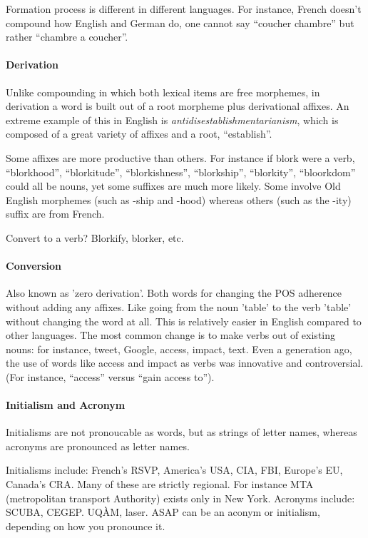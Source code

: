\documentclass{exam}
\begin{document}
Formation process is different in different languages. 
For instance, French doesn't compound how English and German do, one cannot say ``coucher chambre'' but rather ``chambre a coucher''. 

\paragraph{Derivation} Unlike compounding in which both lexical items are free morphemes, in derivation a word is built out of a root morpheme plus derivational affixes. 
An extreme example of this in English is \textit{antidisestablishmentarianism}, which is composed of a great variety of affixes and a root, ``establish''. 

Some affixes are more productive than others. For instance if blork were a verb, ``blorkhood'', ``blorkitude'', ``blorkishness'', ``blorkship'', ``blorkity'', ``bloorkdom'' could all be nouns, yet some suffixes are much more likely.  
Some involve Old English morphemes (such as -ship and -hood) whereas others (such as the -ity) suffix are from French. 

Convert to a verb? Blorkify, blorker, etc. 

\paragraph{Conversion} Also known as 'zero derivation'. Both words for changing the POS adherence without adding any affixes. 
Like going from the noun 'table' to the verb 'table' without changing the word at all. 
This is relatively easier in English compared to other languages. 
The most common change is to make verbs out of existing nouns: for instance, tweet, Google, access, impact, text. 
Even a generation ago, the use of words like access and impact as verbs was innovative and controversial. 
(For instance, ``access'' versus ``gain access to''). 

\paragraph{Initialism and Acronym} 

Initialisms are not pronoucable as words, but as strings of letter names, whereas acronyms are pronounced as letter names. 

Initialisms include: French's RSVP, America's USA, CIA, FBI, Europe's EU, Canada's CRA. 
Many of these are strictly regional. 
For instance MTA (metropolitan transport Authority) exists only in New York. 
Acronyms include: SCUBA, CEGEP. UQ\`AM, laser.
ASAP can be an aconym or initialism, depending on how you pronounce it. 
\end{document}
